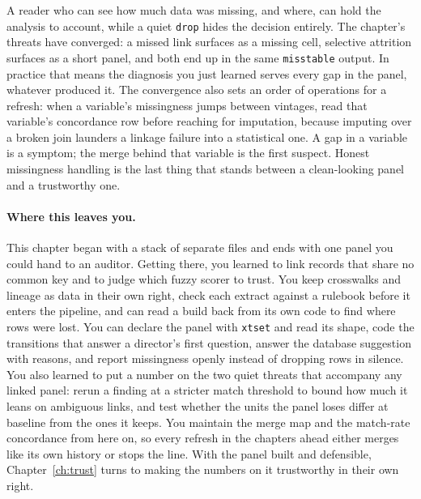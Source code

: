 A reader who can see how much data was missing, and where, can hold the analysis to account, while a quiet \texttt{drop} hides the decision entirely. The chapter's threats have converged: a missed link surfaces as a missing cell, selective attrition surfaces as a short panel, and both end up in the same \texttt{misstable} output. In practice that means the diagnosis you just learned serves every gap in the panel, whatever produced it. The convergence also sets an order of operations for a refresh: when a variable's missingness jumps between vintages, read that variable's concordance row before reaching for imputation, because imputing over a broken join launders a linkage failure into a statistical one. A gap in a variable is a symptom; the merge behind that variable is the first suspect. Honest missingness handling is the last thing that stands between a clean-looking panel and a trustworthy one.

\paragraph{Where this leaves you.} This chapter began with a stack of separate files and ends with one panel you could hand to an auditor. Getting there, you learned to link records that share no common key and to judge which fuzzy scorer to trust. You keep crosswalks and lineage as data in their own right, check each extract against a rulebook before it enters the pipeline, and can read a build back from its own code to find where rows were lost. You can declare the panel with \texttt{xtset} and read its shape, code the transitions that answer a director's first question, answer the database suggestion with reasons, and report missingness openly instead of dropping rows in silence. You also learned to put a number on the two quiet threats that accompany any linked panel: rerun a finding at a stricter match threshold to bound how much it leans on ambiguous links, and test whether the units the panel loses differ at baseline from the ones it keeps. You maintain the merge map and the match-rate concordance from here on, so every refresh in the chapters ahead either merges like its own history or stops the line. With the panel built and defensible, Chapter~\ref{ch:trust} turns to making the numbers on it trustworthy in their own right.

